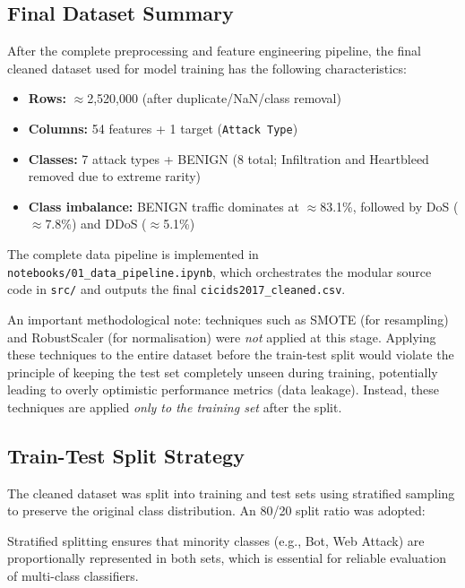 \documentclass[12pt, a4paper]{article}
\begin{document}
\subsection{Final Dataset Summary}

After the complete preprocessing and feature engineering pipeline, the final cleaned dataset used for model training has the following characteristics:

\begin{itemize}
    \item \textbf{Rows:} $\approx$2,520,000 (after duplicate/NaN/class removal)
    \item \textbf{Columns:} 54 features + 1 target (\texttt{Attack Type})
    \item \textbf{Classes:} 7 attack types + BENIGN (8 total; Infiltration and Heartbleed removed due to extreme rarity)
    \item \textbf{Class imbalance:} BENIGN traffic dominates at $\approx$83.1\%, followed by DoS ($\approx$7.8\%) and DDoS ($\approx$5.1\%)
\end{itemize}

\noindent
The complete data pipeline is implemented in \texttt{notebooks/01\_data\_pipeline.ipynb}, which orchestrates the modular source code in \texttt{src/} and outputs the final \texttt{cicids2017\_cleaned.csv}.

An important methodological note: techniques such as SMOTE (for resampling) and RobustScaler (for normalisation) were \textit{not} applied at this stage.
Applying these techniques to the entire dataset before the train-test split would violate the principle of keeping the test set completely unseen during training, potentially leading to overly optimistic performance metrics (data leakage).
Instead, these techniques are applied \textit{only to the training set} after the split.

\subsection{Train-Test Split Strategy}

The cleaned dataset was split into training and test sets using stratified sampling to preserve the original class distribution.
An 80/20 split ratio was adopted:

\noindent
Stratified splitting ensures that minority classes (e.g., Bot, Web Attack) are proportionally represented in both sets, which is essential for reliable evaluation of multi-class classifiers.
\end{document}

